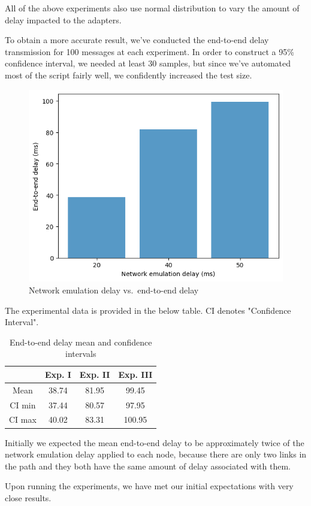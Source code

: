 \documentclass[conference]{IEEEtran}
\begin{document}
All of the above experiments also use normal distribution to vary the amount of delay impacted to
the adapters.

To obtain a more accurate result, we've conducted the end-to-end delay transmission for 100 messages
at each experiment. In order to construct a 95\% confidence interval, we needed at least 30 samples,
but since we've automated most of the script fairly well, we confidently increased the test size.

\begin{figure}
    \center
    \includegraphics[width=\columnwidth]{images/chart}
    \caption{Network emulation delay vs.\ end-to-end delay}
    \label{fig:graph}
\end{figure}

The experimental data is provided in the below table. CI denotes "Confidence Interval".

\begin{table}[h]
    \centering
\renewcommand{\arraystretch}{2.5}
    \begin{tabular}{|c|c|c|c|}
\hline
              & Exp. I & Exp. II & Exp. III \\
\hline
        Mean  & 38.74  & 81.95   & 99.45 \\
\hline
        CI min & 37.44 & 80.57 & 97.95 \\
\hline
        CI max & 40.02 & 83.31 & 100.95 \\
\hline
    \end{tabular}
    \caption{End-to-end delay mean and confidence intervals}
    \label{table:data}
\end{table}

Initially we expected the mean end-to-end delay to be approximately twice of the network emulation
delay applied to each node, because there are only two links in the path and they both have the
same amount of delay associated with them.

Upon running the experiments, we have met our initial expectations with very close results.
\end{document}
